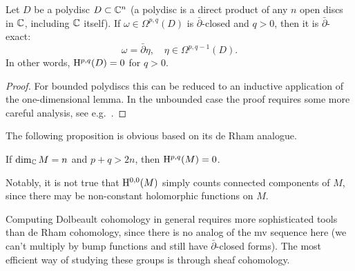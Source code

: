 \begin{thm} Let $D$ be a polydisc $D\subset \mathbb{C}^n$ (a polydisc is a direct product of any $n$ open discs in $\mathbb{C}$, including $\mathbb{C}$ itself). If $\omega\in\Omega^{p,q}(D)$ is $\bar\partial$-closed and $q>0$, then it is $\bar\partial$-exact:
    \[\omega=\bar\partial\eta,\quad \eta\in\Omega^{p,q-1}(D).\]
    In other words, $\mathrm{H}^{p,q}(D)=0$ for $q>0$.
\end{thm}
\begin{proof}
    For bounded polydiscs this can be reduced to an inductive application of the one-dimensional lemma. In the unbounded case the proof requires some more careful analysis, see e.g.\ \cite[Prop.\ 1.3.8 and Cor.\ 1.3.9]{Huybrechts}.
\end{proof}

The following proposition is obvious based on its de Rham analogue.

\begin{prop}
    If $\dim_{\mathbb{C}} M=n$ and $p+q>2n$, then $\mathrm{H}^{p,q}(M)=0$.
\end{prop}

Notably, it is not true that $\mathrm{H}^{0,0}(M)$ simply counts connected components of $M$, since there may be non-constant holomorphic functions on $M$.

Computing Dolbeault cohomology in general requires more sophisticated tools than de Rham cohomology, since there is no analog of the \gls{mv} sequence here (we can't multiply by bump functions and still have $\bar\partial$-closed forms). The most efficient way of studying these groups is through sheaf cohomology.


